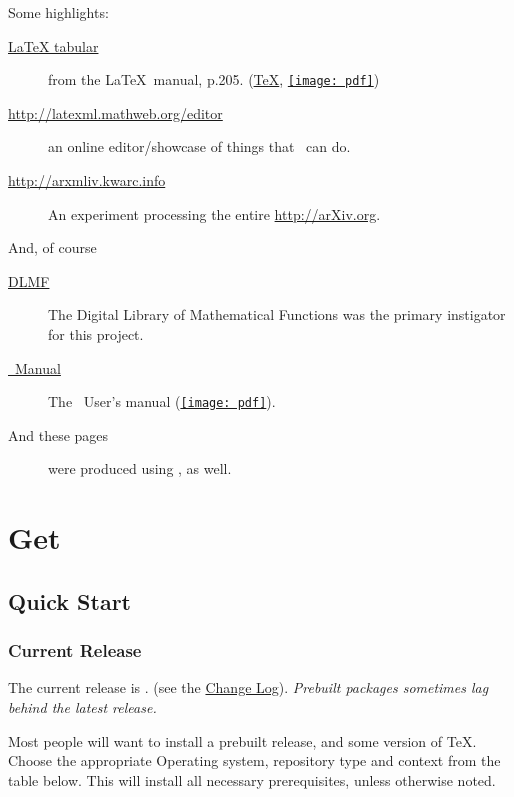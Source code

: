 \documentclass{article}
\newcommand{\PDFIcon}{\texttt{[image: pdf]}}
\begin{document}
Some highlights:
\begin{description}
\item[\href{examples/tabular/tabular.html}{LaTeX tabular}]
    from the \LaTeX\ manual, p.205.
    (\href{examples/tabular/tabular.tex}{\TeX},
     \href{examples/tabular/tabular.pdf}{\PDFIcon})
\item[\url{http://latexml.mathweb.org/editor}] an online editor/showcase
  of things that \LaTeXML\ can do.
\item[\url{http://arxmliv.kwarc.info}] An experiment processing
  the entire \url{http://arXiv.org}.
\end{description}
And, of course
\begin{description}
\item[\href{http://dlmf.nist.gov/}{DLMF}]
   The Digital Library of Mathematical Functions was the
   primary instigator for this project.
\item[\href{manual/}{\LaTeXML\ Manual}]
   The \LaTeXML\ User's manual (\href{manual.pdf}{\PDFIcon}).
\item[And these pages] were produced using \LaTeXML, as well.
\end{description}

\section{Get \LaTeXML}\label{get}
\def\GitHub{\href{https://github.com/}{GitHub}}
\def\MacPorts{\href{http://www.macports.org}{MacPorts}}
\def\MacTeX{\href{http://tug.org/mactex/}{MacTeX}}
\def\Chocolatey{\href{http://chocolatey.org}{Chocolatey}}
\def\MikTeX{\href{https://MiKTeX.org}{MikTeX}}


\subsection{Quick Start}\label{get.quick}
\subsubsection{Current Release}\label{get.current}
The current release is \textbf{\CurrentVersion}. (see the \href{Changes}{Change Log}).
\emph{Prebuilt packages sometimes lag behind the latest release.}

Most people will want to install a prebuilt release,
and some version of \TeX. Choose the appropriate
Operating system, repository type and context from the table below.
This will install all necessary prerequisites, unless otherwise noted.
\end{document}
